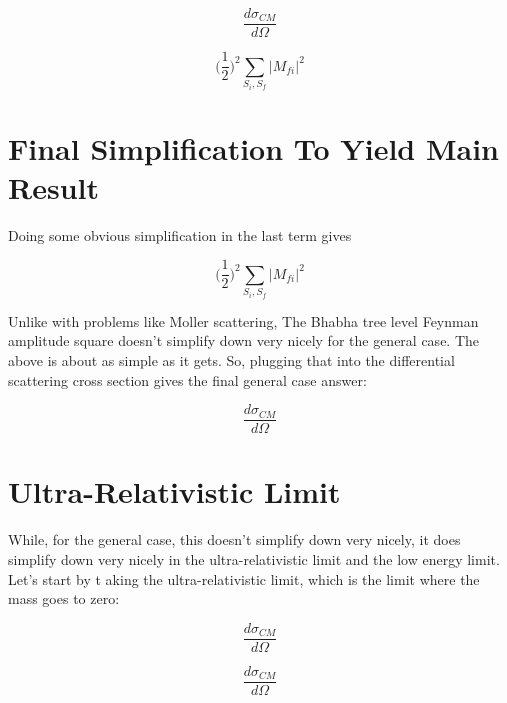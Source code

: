 \documentclass[a4]{article}
\begin{document}
    \begin{equation}
        \frac{d \sigma_{CM}}{d \Omega}
    \end{equation}

    \begin{equation}
        \Big( \frac{1}{2} \Big)^2 \sum_{S_i, S_f} |M_{f i}|^2
    \end{equation}

    \section*{Final Simplification To Yield Main Result}

    Doing some obvious simplification in the last term gives

    \begin{equation}
        \Big( \frac{1}{2} \Big)^2 \sum_{S_i, S_f} |M_{f i}|^2
    \end{equation}

    Unlike with problems like Moller scattering, The Bhabha tree level Feynman amplitude square doesn't simplify down very nicely for the general case. The above is about as simple as it gets. So, plugging
    that into the differential scattering cross section gives the final general case answer:

    \begin{framed}
        \begin{equation}
            \frac{d \sigma_{CM}}{d \Omega}
        \end{equation}
    \end{framed}

    \section*{Ultra-Relativistic Limit}

    While, for the general case, this doesn't simplify down very nicely, it does simplify down very nicely in the ultra-relativistic limit and the low energy limit. Let's start by t aking the ultra-relativistic limit, 
    which is the limit where the mass goes to zero:
    
    \begin{equation}
        \frac{d \sigma_{CM}}{d \Omega}
    \end{equation}

    \begin{equation}
        \frac{d \sigma_{CM}}{d \Omega}
    \end{equation}
\end{document}
